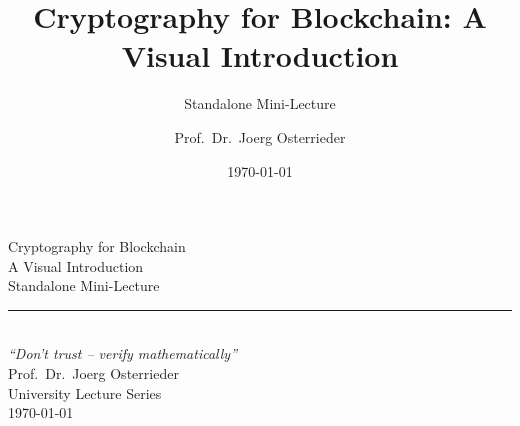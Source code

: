 \documentclass[8pt,aspectratio=169]{beamer}
\title{Cryptography for Blockchain: A Visual Introduction}
\subtitle{Standalone Mini-Lecture}
\author{Prof.~Dr.~Joerg Osterrieder}
\institute{University Lecture Series}
\date{\today}
\begin{document}
\begin{frame}[plain]
\vspace{2cm}
\begin{center}
{\Huge\color{mlpurple} Cryptography for Blockchain}\\[0.4cm]
{\Large\color{mlblue} A Visual Introduction}\\[0.3cm]
{\normalsize Standalone Mini-Lecture}\\[0.3cm]
\textcolor{mlgray}{\rule{6cm}{0.4pt}}\\[0.3cm]
{\small\itshape ``Don't trust -- verify mathematically''}\\[1.5cm]
{\normalsize Prof.~Dr.~Joerg Osterrieder}\\[0.2cm]
{\small University Lecture Series}\\[0.2cm]
{\small \today}
\end{center}
\end{frame}
\end{document}
